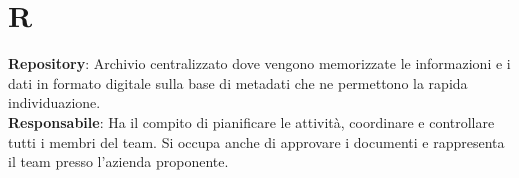 \section{R}
\textbf{Repository}: Archivio centralizzato dove vengono memorizzate le informazioni e i dati in formato digitale sulla base di metadati che ne permettono la rapida individuazione.\\
\textbf{Responsabile}: Ha il compito di pianificare le attività, coordinare e controllare tutti i membri del team.
Si occupa anche di approvare i documenti e rappresenta il team presso l'azienda proponente.\\
